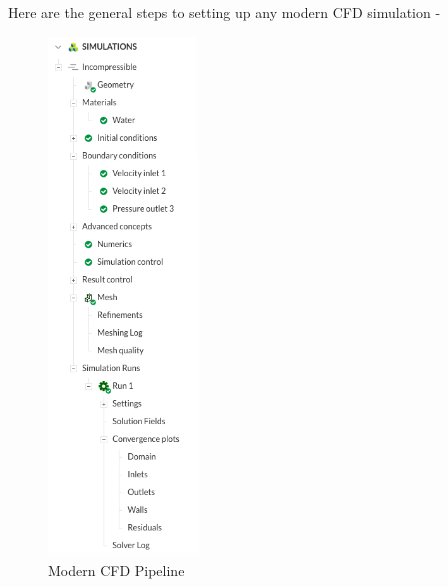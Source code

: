 \documentclass[12pt]{article}
\begin{document}
Here are the general steps to setting up any modern CFD simulation - 
\begin{figure}[hbt!]
  \centering
  \includegraphics[width=4cm]{plot55.png}
  \caption{Modern CFD Pipeline\label{fig:fig1}}
\end{figure}
\FloatBarrier 
\end{document}
